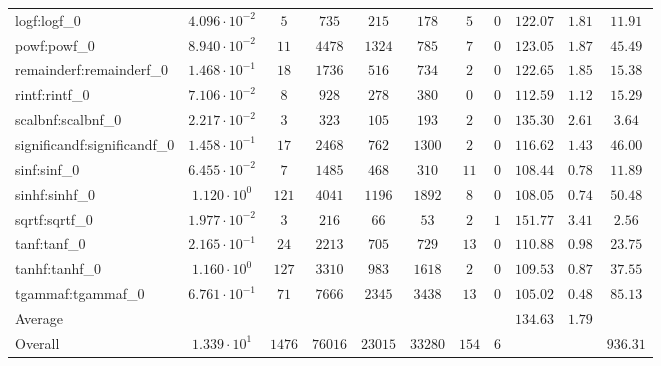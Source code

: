 \begin{tabular}{|l|c|c|c|c|c|c|c|c|c|c|}
logf:logf\_0                 & $ 4.096 \cdot 10^{-2} $ & $ 5      $ & $ 735   $ & $ 215   $ & $ 178   $ & $ 5   $ & $ 0 $ & $ 122.07      $ & $ 1.81    $ & $ 11.91   $ \\
powf:powf\_0                 & $ 8.940 \cdot 10^{-2} $ & $ 11     $ & $ 4478  $ & $ 1324  $ & $ 785   $ & $ 7   $ & $ 0 $ & $ 123.05      $ & $ 1.87    $ & $ 45.49   $ \\
remainderf:remainderf\_0     & $ 1.468 \cdot 10^{-1} $ & $ 18     $ & $ 1736  $ & $ 516   $ & $ 734   $ & $ 2   $ & $ 0 $ & $ 122.65      $ & $ 1.85    $ & $ 15.38   $ \\
rintf:rintf\_0               & $ 7.106 \cdot 10^{-2} $ & $ 8      $ & $ 928   $ & $ 278   $ & $ 380   $ & $ 0   $ & $ 0 $ & $ 112.59      $ & $ 1.12    $ & $ 15.29   $ \\
scalbnf:scalbnf\_0           & $ 2.217 \cdot 10^{-2} $ & $ 3      $ & $ 323   $ & $ 105   $ & $ 193   $ & $ 2   $ & $ 0 $ & $ 135.30      $ & $ 2.61    $ & $ 3.64    $ \\
significandf:significandf\_0 & $ 1.458 \cdot 10^{-1} $ & $ 17     $ & $ 2468  $ & $ 762   $ & $ 1300  $ & $ 2   $ & $ 0 $ & $ 116.62      $ & $ 1.43    $ & $ 46.00   $ \\
sinf:sinf\_0                 & $ 6.455 \cdot 10^{-2} $ & $ 7      $ & $ 1485  $ & $ 468   $ & $ 310   $ & $ 11  $ & $ 0 $ & $ 108.44      $ & $ 0.78    $ & $ 11.89   $ \\
sinhf:sinhf\_0               & $ 1.120 \cdot 10^{0}  $ & $ 121    $ & $ 4041  $ & $ 1196  $ & $ 1892  $ & $ 8   $ & $ 0 $ & $ 108.05      $ & $ 0.74    $ & $ 50.48   $ \\
sqrtf:sqrtf\_0               & $ 1.977 \cdot 10^{-2} $ & $ 3      $ & $ 216   $ & $ 66    $ & $ 53    $ & $ 2   $ & $ 1 $ & $ 151.77      $ & $ 3.41    $ & $ 2.56    $ \\
tanf:tanf\_0                 & $ 2.165 \cdot 10^{-1} $ & $ 24     $ & $ 2213  $ & $ 705   $ & $ 729   $ & $ 13  $ & $ 0 $ & $ 110.88      $ & $ 0.98    $ & $ 23.75   $ \\
tanhf:tanhf\_0               & $ 1.160 \cdot 10^{0}  $ & $ 127    $ & $ 3310  $ & $ 983   $ & $ 1618  $ & $ 2   $ & $ 0 $ & $ 109.53      $ & $ 0.87    $ & $ 37.55   $ \\
tgammaf:tgammaf\_0           & $ 6.761 \cdot 10^{-1} $ & $ 71     $ & $ 7666  $ & $ 2345  $ & $ 3438  $ & $ 13  $ & $ 0 $ & $ 105.02      $ & $ 0.48    $ & $ 85.13   $ \\
\hline
Average                      & $                     $ & $        $ & $       $ & $       $ & $       $ & $     $ & $   $ & $ 134.63      $ & $ 1.79    $ & $         $ \\
\hline
Overall                      & $ 1.339 \cdot 10^{1}  $ & $ 1476   $ & $ 76016 $ & $ 23015 $ & $ 33280 $ & $ 154 $ & $ 6 $ & $             $ & $         $ & $ 936.31  $ \\
\hline
\end{tabular}
